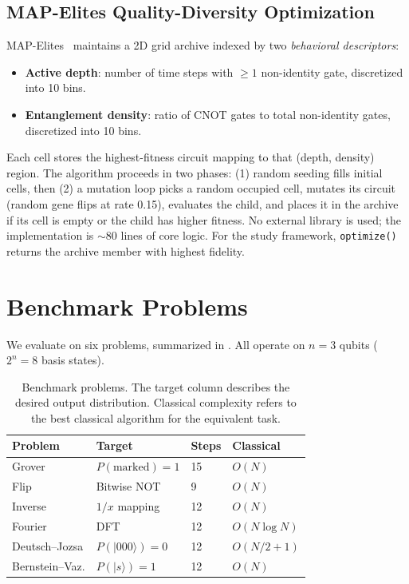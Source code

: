 \documentclass[twocolumn,11pt]{article}
\begin{document}
\subsection{MAP-Elites Quality-Diversity Optimization}

MAP-Elites~\cite{mouret2015illuminating} maintains a 2D grid archive indexed by
two \emph{behavioral descriptors}:
\begin{itemize}[nosep]
    \item \textbf{Active depth}: number of time steps with $\geq 1$ non-identity
          gate, discretized into 10 bins.
    \item \textbf{Entanglement density}: ratio of CNOT gates to total
          non-identity gates, discretized into 10 bins.
\end{itemize}
Each cell stores the highest-fitness circuit mapping to that (depth, density)
region.  The algorithm proceeds in two phases: (1) random seeding fills initial
cells, then (2) a mutation loop picks a random occupied cell, mutates its
circuit (random gene flips at rate 0.15), evaluates the child, and places it in
the archive if its cell is empty or the child has higher fitness.  No external
library is used; the implementation is $\sim$80 lines of core logic.  For the
study framework, \texttt{optimize()} returns the archive member with highest
fidelity.

\section{Benchmark Problems}\label{sec:problems}

We evaluate on six problems, summarized in .  All operate on
$n{=}3$ qubits ($2^n{=}8$ basis states).

\begin{table}[t]
\centering
\caption{Benchmark problems.  The target column describes the desired output
distribution.  Classical complexity refers to the best classical algorithm for
the equivalent task.}
\label{tab:problems}
\small
\begin{tabular}{@{}llll@{}}
\toprule
\textbf{Problem} & \textbf{Target} & \textbf{Steps} & \textbf{Classical} \\
\midrule
Grover           & $P(\text{marked})=1$ & 15 & $O(N)$ \\
Flip             & Bitwise NOT          & 9  & $O(N)$ \\
Inverse          & $1/x$ mapping        & 12  & $O(N)$ \\
Fourier          & DFT                  & 12  & $O(N\log N)$ \\
Deutsch--Jozsa   & $P(|000\rangle)=0$   & 12  & $O(N/2{+}1)$ \\
Bernstein--Vaz.  & $P(|s\rangle)=1$     & 12  & $O(N)$ \\
\bottomrule
\end{tabular}
\end{table}
\end{document}
